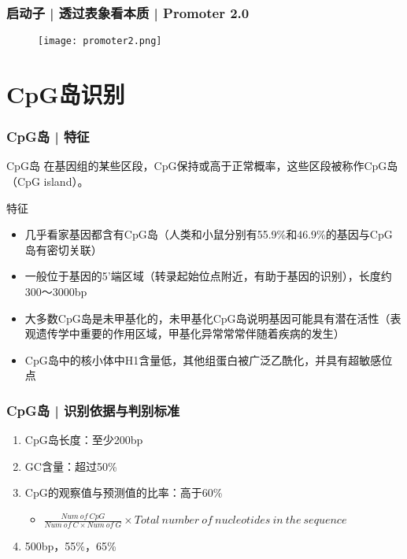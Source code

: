 
\begin{frame}
  \frametitle{启动子 | 透过表象看本质 | Promoter 2.0}
  \begin{figure}
    \centering
    \texttt{[image: promoter2.png]}
  \end{figure}
\end{frame}

\section{CpG岛识别}
\begin{frame}
  \frametitle{CpG岛 | 特征}
  \begin{block}{\alert{CpG岛}}
    在基因组的某些区段，CpG保持或高于正常概率，这些区段被称作CpG岛（CpG island）。
  \end{block}
  \pause
  \begin{block}{特征}
    \begin{itemize}
      \item 几乎看家基因都含有CpG岛（人类和小鼠分别有55.9\%和46.9\%的基因与CpG岛有密切关联）
      \item 一般位于基因的5'端区域（转录起始位点附近，有助于基因的识别），长度约300～3000bp
      \item 大多数CpG岛是未甲基化的，未甲基化CpG岛说明基因可能具有潜在活性（表观遗传学中重要的作用区域，甲基化异常常常伴随着疾病的发生）
      \item CpG岛中的核小体中H1含量低，其他组蛋白被广泛乙酰化，并具有超敏感位点
    \end{itemize}
  \end{block}
\end{frame}

\begin{frame}
  \frametitle{CpG岛 | \alert{识别依据与判别标准}}
  \begin{enumerate}
    \item CpG岛长度：至少200bp
    \item GC含量：超过50\%
    \item CpG的观察值与预测值的比率：高于60\%
      \begin{itemize}
        \item $\frac{Num\ of\ CpG}{Num\ of\ C \times Num\ of\ G} \times Total\ number\ of\ nucleotides\ in\ the\ sequence$
      \end{itemize}
    \pause
    \item 500bp，55\%，65\%
  \end{enumerate}
\end{frame}

